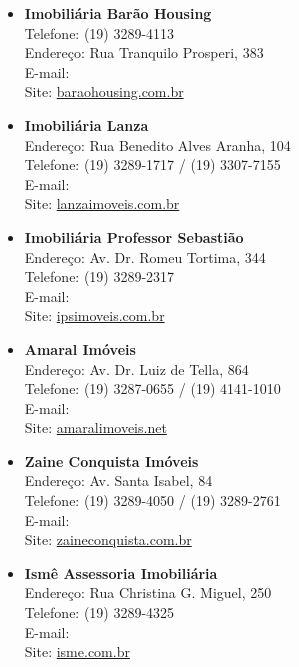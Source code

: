 \begin{itemize}
\item   \textbf{Imobiliária Barão Housing}
        \\Telefone: (19) 3289-4113
        \\Endereço: Rua Tranquilo Prosperi, 383
        \\E-mail: 
        \\Site: \url{baraohousing.com.br}

\item   \textbf{Imobiliária Lanza}
		\\Endereço: Rua Benedito Alves Aranha, 104
		\\Telefone: (19) 3289-1717 / (19) 3307-7155
		\\E-mail: 
		\\Site: \url{lanzaimoveis.com.br}

\item   \textbf{Imobiliária Professor Sebastião}
		\\Endereço: Av. Dr. Romeu Tortima, 344
		\\Telefone: (19) 3289-2317
		\\E-mail: 
		\\Site: \url{ipsimoveis.com.br}

\item   \textbf{Amaral Imóveis}
		\\Endereço: Av. Dr. Luiz de Tella, 864
		\\Telefone: (19) 3287-0655 / (19) 4141-1010
		\\E-mail: 
		\\Site: \url{amaralimoveis.net}

\item   \textbf{Zaine Conquista Imóveis}
		\\Endereço: Av. Santa Isabel, 84
		\\Telefone: (19) 3289-4050 / (19) 3289-2761
		\\E-mail: 
		\\Site: \url{zaineconquista.com.br}

\item   \textbf{Ismê Assessoria Imobiliária}
		\\Endereço: Rua Christina G. Miguel, 250
		\\Telefone: (19) 3289-4325
		\\E-mail: 
		\\Site: \url{isme.com.br}


\end{itemize}
